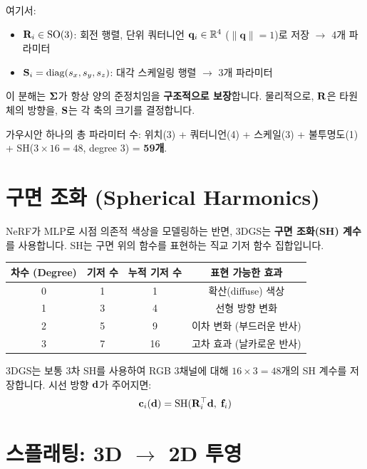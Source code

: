 \documentclass[11pt, a4paper]{report}
\begin{document}
여기서:
\begin{itemize}[leftmargin=*]
  \item $\mathbf{R}_i \in \mathrm{SO}(3)$: 회전 행렬, 단위 쿼터니언 $\mathbf{q}_i \in \mathbb{R}^4$ ($\|\mathbf{q}\|=1$)로 저장 $\rightarrow$ 4개 파라미터
  \item $\mathbf{S}_i = \mathrm{diag}(s_x, s_y, s_z)$: 대각 스케일링 행렬 $\rightarrow$ 3개 파라미터
\end{itemize}

이 분해는 $\bm{\Sigma}$가 항상 양의 준정치임을 \textbf{구조적으로 보장}합니다. 물리적으로, $\mathbf{R}$은 타원체의 방향을, $\mathbf{S}$는 각 축의 크기를 결정합니다.

\begin{remark}
가우시안 하나의 총 파라미터 수: 위치(3) + 쿼터니언(4) + 스케일(3) + 불투명도(1) + SH($3 \times 16 = 48$, degree 3) = \textbf{59개}.
\end{remark}


\section{구면 조화 (Spherical Harmonics)}
\label{sec:sh}

NeRF가 MLP로 시점 의존적 색상을 모델링하는 반면, 3DGS는 \textbf{구면 조화(SH) 계수}를 사용합니다. SH는 구면 위의 함수를 표현하는 직교 기저 함수 집합입니다.

\begin{center}
\renewcommand{\arraystretch}{1.3}
\begin{tabular}{cccc}
\toprule
\textbf{차수 (Degree)} & \textbf{기저 수} & \textbf{누적 기저 수} & \textbf{표현 가능한 효과} \\
\midrule
0 & 1 & 1 & 확산(diffuse) 색상 \\
1 & 3 & 4 & 선형 방향 변화 \\
2 & 5 & 9 & 이차 변화 (부드러운 반사) \\
3 & 7 & 16 & 고차 효과 (날카로운 반사) \\
\bottomrule
\end{tabular}
\end{center}

3DGS는 보통 3차 SH를 사용하여 RGB 3채널에 대해 $16 \times 3 = 48$개의 SH 계수를 저장합니다. 시선 방향 $\mathbf{d}$가 주어지면:
\begin{equation}
\mathbf{c}_i(\mathbf{d}) = \mathrm{SH}(\mathbf{R}_i^\top \mathbf{d},\; \mathbf{f}_i)
\label{eq:sh_color}
\end{equation}


\section{스플래팅: 3D $\rightarrow$ 2D 투영}
\label{sec:splatting}
\end{document}

